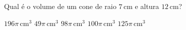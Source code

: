 Qual é o volume de um cone de raio $7$\,cm e altura $12$\,cm?

$196\pi$\,cm$^3$
$49\pi$\,cm$^3$
$98\pi$\,cm$^3$
$100\pi$\,cm$^3$
$125\pi$\,cm$^3$


